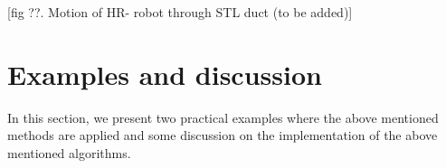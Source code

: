 \documentclass[12pt,a4]{article}
\begin{document}
[fig ??. Motion of HR- robot through STL duct (to be added)]

%

%

\section{Examples and discussion}
In this section, we present two practical examples where the above mentioned methods are applied and some discussion on the implementation of the above mentioned algorithms.
\end{document}
